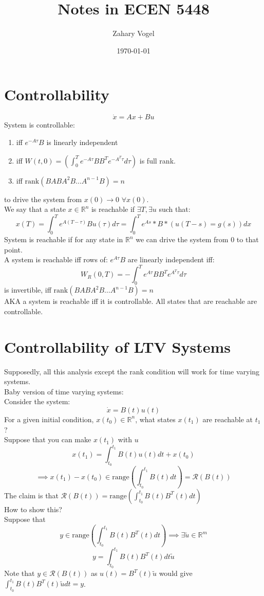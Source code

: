 \documentclass{article}
\author{Zahary Vogel}
\date{\today}
\title{Notes in ECEN 5448}
\newcommand{\rank}{\text{rank}}
\newcommand{\rng}{\text{range}}
\begin{document}
\maketitle


\section{Controllability}
\[\dot{x}=Ax+Bu\]
System is controllable:
\begin{enumerate}
    \item iff $e^{-A\tau}B$ is linearly independent
    \item iff $W(t,0)=(\int_0^Te^{-A\tau}BB^Te^{-A^T\tau}d\tau)$ is full rank.\\
    \item iff $\rank(B AB A^2B \dots A^{n-1}B)=n$
\end{enumerate}
to drive the system from $x(0)\to 0$ $\forall x(0)$.\\

We say that a state $x\in\mathbb{R}^n$ is reachable if $\exists T,\exists u$ such that:\\
\[x(T)=\int_0^Te^{A(T-\tau)}Bu(\tau)d\tau=\int_0^Te^{As}*B*(u(T-s)=g(s))dx\]
System is reachable if for any state in $\mathbb{R}^n$ we can drive the system from 0 to that point.\\
A system is reachable iff rows of: $e^{A\tau}B$ are linearly independent iff:\\
\[W_R(0,T)=-\int_0^Te^{A\tau}BB^Te^{A^T\tau}d\tau\]
is invertible, iff $\rank(B AB A^2B \dots A^{n-1}B)=n$\\
AKA a system is reachable iff it is controllable. All states that are reachable are controllable.\\

\section{Controllability of LTV Systems}
Supposedly, all this analysis except the rank condition will work for time varying systems.\\
Baby version of time varying systems:\\
Consider the system:
\[\dot{x}=B(t)u(t)\]
For a given initial condition, $x(t_0)\in\mathbb{R}^n$, what states $x(t_1)$ are reachable at $t_1$?\\
Suppose that you can make $x(t_1)$ with $u$\\
\[x(t_1)=\int_{t_0}^{t_1}B(t)u(t)dt+x(t_0)\]
\[\implies x(t_1)-x(t_0)\in\rng\left (\int_{t_0}^{t_1}B(t)dt\right )=\mathcal{R}(B(t))\]
The claim is that $\mathcal{R}(B(t))=\rng\left (\int_{t_0}^{t_1}B(t)B^T(t)dt\right)$\\
How to show this?\\
Suppose that \\
\[y\in\rng\left (\int_{t_0}^{t_1}B(t)B^T(t)dt\right )\implies \exists \tilde{u}\in\mathbb{R}^m\]
\[y=\int_{t_0}^{t_1}B(t)B^T(t)dt\tilde{u}\]
Note that $y\in\mathcal{R}(B(t))$ as $u(t)=B^T(t)\tilde{u}$ would give $\int_{t_0}^{t_1}B(t)B^T(t)\tilde{u}dt=y$.\\
\end{document}
